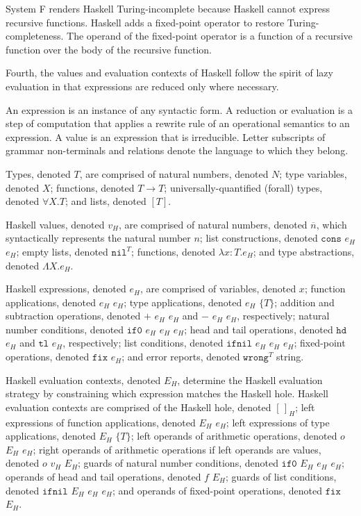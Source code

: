 System F renders Haskell Turing-incomplete because Haskell cannot express recursive functions.  Haskell adds a fixed-point operator to restore Turing-completeness.  The operand of the fixed-point operator is a function of a recursive function over the body of the recursive function.

Fourth, the values and evaluation contexts of Haskell follow the spirit of lazy evaluation in that expressions are reduced only where necessary.

An expression is an instance of any syntactic form.  A reduction or evaluation is a step of computation that applies a rewrite rule of an operational semantics to an expression.  A value is an expression that is irreducible.  Letter subscripts of grammar non-terminals and relations denote the language to which they belong.

Types, denoted $T$, are comprised of natural numbers, denoted $N$; type variables, denoted $X$; functions, denoted $T\rightarrow T$; universally-quantified (forall) types, denoted $\forall X.T$; and lists, denoted $[T]$.

Haskell values, denoted $v_{H}$, are comprised of natural numbers, denoted $\overline{n}$, which syntactically represents the natural number $n$; list constructions, denoted $\mathtt{cons}$ $e_{H}$ $e_{H}$; empty lists, denoted $\mathtt{nil}^{T}$; functions, denoted $\lambda x:T.e_{H}$; and type abstractions, denoted $\Lambda X.e_{H}$.

Haskell expressions, denoted $e_{H}$, are comprised of variables, denoted $x$; function applications, denoted $e_{H}$ $e_{H}$; type applications, denoted $e_{H}$ $\lbrace T\rbrace$; addition and subtraction operations, denoted $+$ $e_{H}$ $e_{H}$ and $-$ $e_{H}$ $e_{H}$, respectively; natural number conditions, denoted $\mathtt{if0}$ $e_{H}$ $e_{H}$ $e_{H}$; head and tail operations, denoted $\mathtt{hd}$ $e_{H}$ and $\mathtt{tl}$ $e_{H}$, respectively; list conditions, denoted $\mathtt{ifnil}$ $e_{H}$ $e_{H}$ $e_{H}$; fixed-point operations, denoted $\mathtt{fix}$ $e_{H}$; and error reports, denoted $\mathtt{wrong}^{T}$ string.

Haskell evaluation contexts, denoted $E_{H}$, determine the Haskell evaluation strategy by constraining which expression matches the Haskell hole.  Haskell evaluation contexts are comprised of the Haskell hole, denoted $[\,]_{H}$; left expressions of function applications, denoted $E_{H}$ $e_{H}$; left expressions of type applications, denoted $E_{H}$ $\lbrace T\rbrace$; left operands of arithmetic operations, denoted $o$ $E_{H}$ $e_{H}$; right operands of arithmetic operations if left operands are values, denoted $o$ $v_{H}$ $E_{H}$; guards of natural number conditions, denoted $\mathtt{if0}$ $E_{H}$ $e_{H}$ $e_{H}$; operands of head and tail operations, denoted $f$ $E_{H}$; guards of list conditions, denoted $\mathtt{ifnil}$ $E_{H}$ $e_{H}$ $e_{H}$; and operands of fixed-point operations, denoted $\mathtt{fix}$ $E_{H}$.

